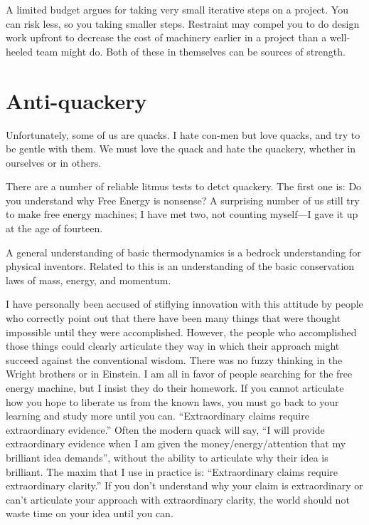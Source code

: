 \documentclass[
	fontsize=10pt, %
	twoside=false, %
	secnumdepth=1, %
]{kaobook}
\begin{document}
A limited budget argues for taking very small iterative steps on a
project.  You can risk less, so you taking smaller steps.
Restraint may compel you to do design work upfront to decrease the cost
of machinery earlier in a project than a well-heeled team might do.
Both of these in themselves can be sources of strength.

\section{Anti-quackery}

Unfortunately, some of us are quacks.
I hate con-men but love quacks, and try to be gentle with them.
We must love the quack and hate the quackery, whether in ourselves
or in others.

There are a number of reliable litmus tests to detct quackery.
The first one is: Do you understand why Free Energy is nonsense?
A surprising number of us still try to make free energy machines;
I have met two, not counting myself---I gave it up at the age of fourteen.

A general understanding of basic thermodynamics is a bedrock
understanding for physical inventors.
Related to this is an understanding of the basic conservation laws
of mass, energy, and momentum.

I have personally been accused of stiflying innovation with
this attitude by people who correctly point out that there have
been many things that were thought impossible until they were accomplished.
However, the people who accomplished those things could clearly
articulate they way in which their approach might succeed against
the conventional wisdom. There was no fuzzy thinking in the
Wright brothers or in Einstein. I am all in favor of
people searching for the free energy machine, but I insist
they do their homework.
If you cannot articulate how you hope to liberate us from the
known laws, you must go back to your learning and study more
until you can. ``Extraordinary claims require extraordinary
evidence.'' Often the modern quack will say, ``I will
provide extraordinary evidence when I am given the
money/energy/attention that my brilliant idea demands'',
without the ability to articulate why their idea is brilliant.
The maxim that I use in practice is: ``Extraordinary claims require
extraordinary clarity.''
If you don't understand why your claim is extraordinary or
can't articulate your approach with extraordinary clarity,
the world should not waste time on your idea until you can.
\end{document}

